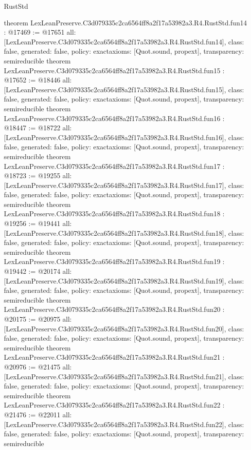 \begin{lexlean}{RustStd}
\begin{coremodule}
{}
theorem LexLeanPreserve.C3d079335c2ca6564ff8a2f17a53982a3.R4.RustStd.fun14 : @17469 := @17651 {
  all: [LexLeanPreserve.C3d079335c2ca6564ff8a2f17a53982a3.R4.RustStd.fun14],
  class: false,
  generated: false,
  policy: exact{axioms: [Quot.sound, propext]},
  transparency: semireducible
}
theorem LexLeanPreserve.C3d079335c2ca6564ff8a2f17a53982a3.R4.RustStd.fun15 : @17652 := @18446 {
  all: [LexLeanPreserve.C3d079335c2ca6564ff8a2f17a53982a3.R4.RustStd.fun15],
  class: false,
  generated: false,
  policy: exact{axioms: [Quot.sound, propext]},
  transparency: semireducible
}
theorem LexLeanPreserve.C3d079335c2ca6564ff8a2f17a53982a3.R4.RustStd.fun16 : @18447 := @18722 {
  all: [LexLeanPreserve.C3d079335c2ca6564ff8a2f17a53982a3.R4.RustStd.fun16],
  class: false,
  generated: false,
  policy: exact{axioms: [Quot.sound, propext]},
  transparency: semireducible
}
theorem LexLeanPreserve.C3d079335c2ca6564ff8a2f17a53982a3.R4.RustStd.fun17 : @18723 := @19255 {
  all: [LexLeanPreserve.C3d079335c2ca6564ff8a2f17a53982a3.R4.RustStd.fun17],
  class: false,
  generated: false,
  policy: exact{axioms: [Quot.sound, propext]},
  transparency: semireducible
}
theorem LexLeanPreserve.C3d079335c2ca6564ff8a2f17a53982a3.R4.RustStd.fun18 : @19256 := @19441 {
  all: [LexLeanPreserve.C3d079335c2ca6564ff8a2f17a53982a3.R4.RustStd.fun18],
  class: false,
  generated: false,
  policy: exact{axioms: [Quot.sound, propext]},
  transparency: semireducible
}
theorem LexLeanPreserve.C3d079335c2ca6564ff8a2f17a53982a3.R4.RustStd.fun19 : @19442 := @20174 {
  all: [LexLeanPreserve.C3d079335c2ca6564ff8a2f17a53982a3.R4.RustStd.fun19],
  class: false,
  generated: false,
  policy: exact{axioms: [Quot.sound, propext]},
  transparency: semireducible
}
theorem LexLeanPreserve.C3d079335c2ca6564ff8a2f17a53982a3.R4.RustStd.fun20 : @20175 := @20975 {
  all: [LexLeanPreserve.C3d079335c2ca6564ff8a2f17a53982a3.R4.RustStd.fun20],
  class: false,
  generated: false,
  policy: exact{axioms: [Quot.sound, propext]},
  transparency: semireducible
}
theorem LexLeanPreserve.C3d079335c2ca6564ff8a2f17a53982a3.R4.RustStd.fun21 : @20976 := @21475 {
  all: [LexLeanPreserve.C3d079335c2ca6564ff8a2f17a53982a3.R4.RustStd.fun21],
  class: false,
  generated: false,
  policy: exact{axioms: [Quot.sound, propext]},
  transparency: semireducible
}
theorem LexLeanPreserve.C3d079335c2ca6564ff8a2f17a53982a3.R4.RustStd.fun22 : @21476 := @22011 {
  all: [LexLeanPreserve.C3d079335c2ca6564ff8a2f17a53982a3.R4.RustStd.fun22],
  class: false,
  generated: false,
  policy: exact{axioms: [Quot.sound, propext]},
  transparency: semireducible
}
\end{coremodule}
\end{lexlean}
